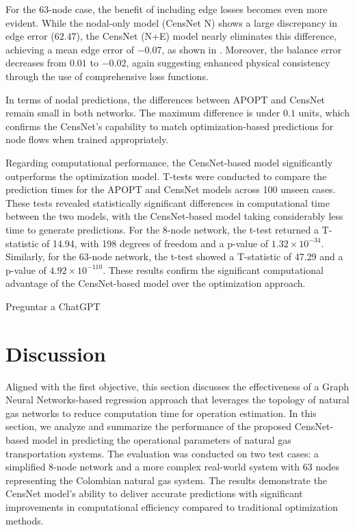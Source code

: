 For the 63-node case, the benefit of including edge losses becomes even more evident. While the nodal-only model (CensNet N) shows a large discrepancy in edge error (\(62.47\)), the CensNet (N+E) model nearly eliminates this difference, achieving a mean edge error of \(-0.07\), as shown in . Moreover, the balance error decreases from \(0.01\) to \(-0.02\), again suggesting enhanced physical consistency through the use of comprehensive loss functions.

In terms of nodal predictions, the differences between APOPT and CensNet remain small in both networks. The maximum difference is under \(0.1\) units, which confirms the CensNet's capability to match optimization-based predictions for node flows when trained appropriately.

Regarding computational performance, the CensNet-based model significantly outperforms the optimization model. T-tests were conducted to compare the prediction times for the APOPT and CensNet models across 100 unseen cases. These tests revealed statistically significant differences in computational time between the two models, with the CensNet-based model taking considerably less time to generate predictions. For the 8-node network, the t-test returned a T-statistic of 14.94, with 198 degrees of freedom and a p-value of $1.32 \times 10^{-34}$. Similarly, for the 63-node network, the t-test showed a T-statistic of 47.29 and a p-value of $4.92 \times 10^{-110}$. These results confirm the significant computational advantage of the CensNet-based model over the optimization approach.



Preguntar a ChatGPT


\section{Discussion}

Aligned with the first objective, this section discusses the effectiveness of a Graph Neural Networks-based regression approach that leverages the topology of natural gas networks to reduce computation time for operation estimation. In this section, we analyze and summarize the performance of the proposed CensNet-based model in predicting the operational parameters of natural gas transportation systems. The evaluation was conducted on two test cases: a simplified 8-node network and a more complex real-world system with 63 nodes representing the Colombian natural gas system. The results demonstrate the CensNet model's ability to deliver accurate predictions with significant improvements in computational efficiency compared to traditional optimization methods.

